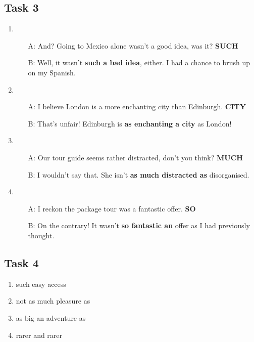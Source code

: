 \documentclass[a4paper]{article}
\begin{document}
\subsection{Task 3}
\begin{enumerate}
    \item \begin{itemize}
        \item[A:] And? Going to Mexico alone wasn't a good idea, was it? \textbf{SUCH}
        \item[B:] Well, it wasn't \textbf{such a bad idea}, either. I had a chance to brush up on my Spanish.
    \end{itemize}
    \item \begin{itemize}
        \item[A:] I believe London is a more enchanting city than Edinburgh. \textbf{CITY}
        \item[B:] That's unfair! Edinburgh is \textbf{as enchanting a city} as London!
    \end{itemize}
    \item \begin{itemize}
        \item[A:] Our tour guide seems rather distracted, don't you think? \textbf{MUCH}
        \item[B:] I wouldn't say that. She isn't \textbf{as much distracted as} disorganised.
    \end{itemize}
    \item \begin{itemize}
        \item[A:] I reckon the package tour was a fantastic offer. \textbf{SO}
        \item[B:] On the contrary! It wasn't \textbf{so fantastic an} offer as I had previously thought.
    \end{itemize}
\end{enumerate}
\subsection{Task 4}
\begin{enumerate}
    \item such easy access
    \item not as much pleasure as
    \item as big an adventure as
    \item rarer and rarer
\end{enumerate}
\end{document}
